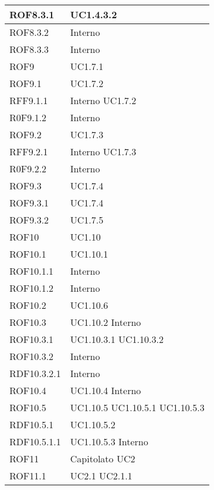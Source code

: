 \begin{center}
\begin{longtable}{| p{4cm} | p{4cm} |}
\hline
ROF8.3.1   &  UC1.4.3.2 \\
\hline
ROF8.3.2   &  Interno \\
\hline
ROF8.3.3   &  Interno \\
\hline
ROF9   &  UC1.7.1 \\
\hline
ROF9.1   &  UC1.7.2 \\
\hline
RFF9.1.1   &  Interno \newline UC1.7.2 \\
\hline
R0F9.1.2   &  Interno \\
\hline
ROF9.2   &  UC1.7.3 \\
\hline
RFF9.2.1   &  Interno \newline UC1.7.3 \\
\hline
R0F9.2.2   &  Interno \\
\hline
ROF9.3   &  UC1.7.4 \\
\hline
ROF9.3.1   &  UC1.7.4 \\
\hline
ROF9.3.2   &  UC1.7.5 \\
\hline
ROF10   &  UC1.10 \\
\hline
ROF10.1   &  UC1.10.1 \\
\hline
ROF10.1.1   &  Interno \\
\hline
ROF10.1.2   &  Interno \\
\hline
ROF10.2   &  UC1.10.6 \\
\hline
ROF10.3   &  UC1.10.2 \newline Interno \\
\hline
ROF10.3.1   &  UC1.10.3.1 \newline UC1.10.3.2 \\
\hline
ROF10.3.2   &  Interno \\
\hline
RDF10.3.2.1   &  Interno \\
\hline
ROF10.4   &  UC1.10.4 \newline Interno \\
\hline
ROF10.5   &  UC1.10.5 \newline UC1.10.5.1 \newline UC1.10.5.3 \\
\hline
RDF10.5.1   &  UC1.10.5.2 \\
\hline
RDF10.5.1.1   &  UC1.10.5.3 \newline Interno \\
\hline
ROF11   &  Capitolato \newline UC2 \\
\hline
ROF11.1   &  UC2.1 \newline UC2.1.1 \\
\hline

\end{longtable}
\end{center}
